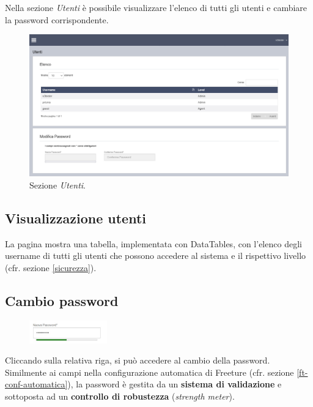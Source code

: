 Nella sezione \emph{Utenti} è possibile visualizzare l'elenco di tutti gli utenti e cambiare la password corrispondente.

\begin{figure}[H]
    \begin{center}
    \includegraphics[width=\textwidth]{images/full-utenti.png}
        \caption{Sezione \emph{Utenti}.}
    \end{center}
\end{figure}

\subsection{Visualizzazione utenti}

La pagina mostra una tabella, implementata con DataTables, con l'elenco degli username di tutti gli utenti che possono accedere al sistema e il rispettivo livello (cfr. sezione \ref{sicurezza}).

\subsection{Cambio password}

\begin{figure}
    \vspace{-4pt}
    \includegraphics[width=0.3\textwidth]{images/pwd-strength-meter.jpg}
    \vspace{-24pt}
\end{figure}

Cliccando sulla relativa riga, si può accedere al cambio della password. Similmente ai campi nella configurazione automatica di Freeture (cfr. sezione \ref{ft-conf-automatica}), la password è gestita da un \textbf{sistema di validazione} e sottoposta ad un \textbf{controllo di robustezza} (\emph{strength meter}).


